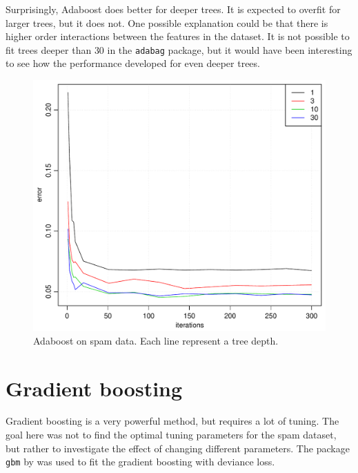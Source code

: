 Surprisingly, Adaboost does better for deeper trees. It is expected to overfit for larger trees, but it does not. One possible explanation could be that there is higher order interactions between the features in the dataset. It is not possible to fit trees deeper than $30$ in the \verb+adabag+ package, but it would have been interesting to see how the performance developed for even deeper trees.
%
\begin{figure}[h!tp]
\begin{center}
    \includegraphics[scale=0.5]{./figures/adaboostSpam.pdf}
\end{center}
\caption{Adaboost on spam data. Each line represent a tree depth.}
\label{fig:adaboostSpam}
\end{figure}
%
\section{Gradient boosting}
\label{sec:SimGradBoost}
Gradient boosting is a very powerful method, but requires a lot of tuning. The goal here was not to find the optimal tuning parameters for the spam dataset, but rather to investigate the effect of changing different parameters. The package \verb+gbm+ by \cite{gbm} was used to fit the gradient boosting with deviance loss.

